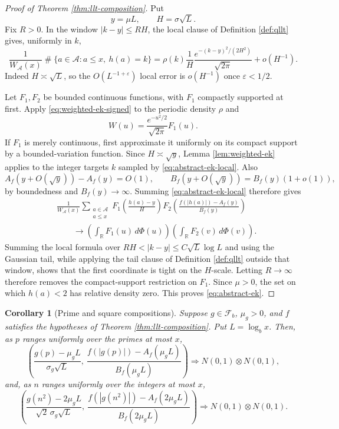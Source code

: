 \documentclass[11pt,reqno]{amsart}
\theoremstyle{plain}
\newtheorem{corollary}[theorem]{Corollary}
\theoremstyle{definition}
\newcommand{\R}{\mathbb{R}}
\newcommand{\eps}{\varepsilon}
\newcommand{\1}{\mathbf 1}
\DeclareMathOperator{\Card}{\#}
\begin{document}
\begin{proof}[Proof of Theorem \ref{thm:llt-composition}]
Put
\[
 y=\mu L,\qquad H=\sigma\sqrt L.
\]
Fix $R>0$.  In the window $|k-y|\le RH$, the local clause of Definition \ref{def:qllt} gives, uniformly in $k$,
\begin{equation}\label{eq:abstract-ek-local}
 \frac1{W_{\mathcal A}(x)}\Card\{a\in\mathcal A:a\le x,\ h(a)=k\}
 =\rho(k)\frac1H\frac{e^{-(k-y)^2/(2H^2)}}{\sqrt{2\pi}}+o(H^{-1}).
\end{equation}
Indeed $H\asymp\sqrt L$, so the $O(L^{-1+\eps})$ local error is $o(H^{-1})$ once $\eps<1/2$.

Let $F_1,F_2$ be bounded continuous functions, with $F_1$ compactly supported at first.  Apply \eqref{eq:weighted-ek-signed} to the periodic density $\rho$ and
\[
 W(u)=\frac{e^{-u^2/2}}{\sqrt{2\pi}}F_1(u).
\]
If $F_1$ is merely continuous, first approximate it uniformly on its compact support by a bounded-variation function.  Since $H\asymp\sqrt y$, Lemma \ref{lem:weighted-ek} applies to the integer targets $k$ sampled by \eqref{eq:abstract-ek-local}.  Also
\[
 A_f(y+O(\sqrt y))-A_f(y)=O(1),\qquad
 B_f(y+O(\sqrt y))=B_f(y)(1+o(1)),
\]
by boundedness and $B_f(y)\to\infty$.  Summing \eqref{eq:abstract-ek-local} therefore gives
\begin{align*}
 &\frac1{W_{\mathcal A}(x)}
 \sum_{\substack{a\in\mathcal A\\a\le x}}
 F_1\!\left(\frac{h(a)-y}{H}\right)
 F_2\!\left(\frac{f(|h(a)|)-A_f(y)}{B_f(y)}\right)\\
 &\qquad\longrightarrow
 \left(\int_{\R}F_1(u)\,d\Phi(u)\right)
 \left(\int_{\R}F_2(v)\,d\Phi(v)\right).
\end{align*}
Summing the local formula over $RH<|k-y|\le C\sqrt L\log L$ and using the Gaussian tail, while applying the tail clause of Definition \ref{def:qllt} outside that window, shows that the first coordinate is tight on the $H$-scale.  Letting $R\to\infty$ therefore removes the compact-support restriction on $F_1$.  Since $\mu>0$, the set on which $h(a)<2$ has relative density zero.  This proves \eqref{eq:abstract-ek}.
\end{proof}

\begin{corollary}[Prime and square compositions]\label{cor:digital-composition}
Suppose $g\in\mathcal F_b$, $\mu_g>0$, and $f$ satisfies the hypotheses of Theorem \ref{thm:llt-composition}.  Put $L=\log_bx$.  Then, as $p$ ranges uniformly over the primes at most $x$,
\begin{equation}\label{eq:prime-composition}
 \left(
 \frac{g(p)-\mu_gL}{\sigma_g\sqrt L},\
 \frac{f(|g(p)|)-A_f(\mu_gL)}{B_f(\mu_gL)}
 \right)
 \Longrightarrow N(0,1)\otimes N(0,1),
\end{equation}
and, as $n$ ranges uniformly over the integers at most $x$,
\begin{equation}\label{eq:square-composition}
 \left(
 \frac{g(n^2)-2\mu_gL}{\sqrt2\,\sigma_g\sqrt L},\
 \frac{f(|g(n^2)|)-A_f(2\mu_gL)}{B_f(2\mu_gL)}
 \right)
 \Longrightarrow N(0,1)\otimes N(0,1).
\end{equation}
\end{corollary}
\end{document}
